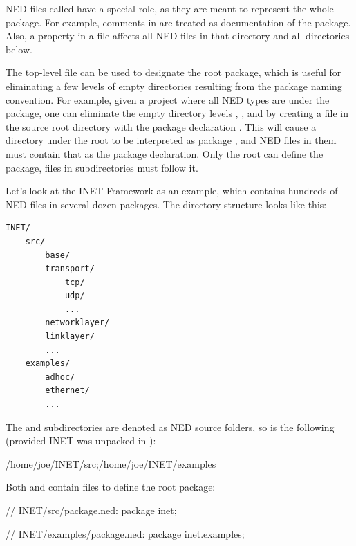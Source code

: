 NED files called  have a special role, as they are meant
to represent the whole package. For example, comments in 
are treated as documentation of the package. Also, a  property
in a  file affects all NED files in that directory and
all directories below.

The top-level  file can be used to designate the root
package, which is useful for eliminating a few levels of empty directories
resulting from the package naming convention. For example, given a project where
all NED types are under the  package, one can eliminate the
empty directory levels , , and  by creating a
 file in the source root directory with the package
declaration . This will cause a directory 
under the root to be interpreted as package , and
NED files in them must contain that as the package declaration. Only the root
 can define the package,  files in
subdirectories must follow it.

Let's look at the INET Framework as an example, which contains hundreds of NED
files in several dozen packages. The directory structure looks like this:

\begin{Verbatim}
INET/
    src/
        base/
        transport/
            tcp/
            udp/
            ...
        networklayer/
        linklayer/
        ...
    examples/
        adhoc/
        ethernet/
        ...
\end{Verbatim}

The  and  subdirectories are denoted as NED source
folders, so  is the following (provided INET was unpacked in
):

\begin{filelisting}
/home/joe/INET/src;/home/joe/INET/examples
\end{filelisting}

Both  and  contain  files to define the root package:

\begin{ned}
// INET/src/package.ned:
package inet;
\end{ned}

\begin{ned}
// INET/examples/package.ned:
package inet.examples;
\end{ned}

